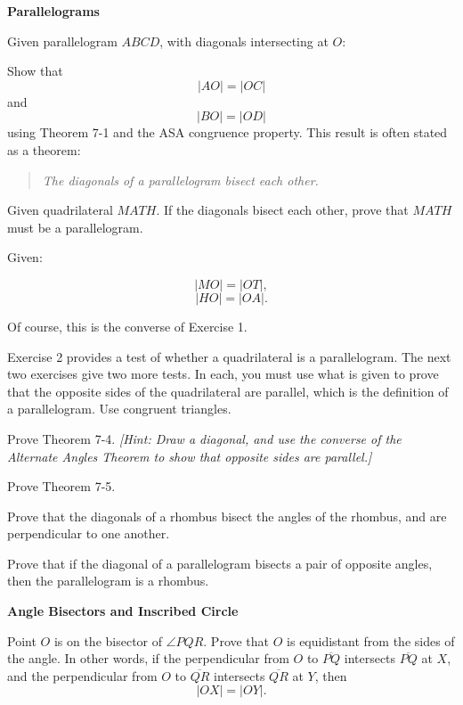 \documentclass[12pt]{book} %
\begin{document}
\setcounter{Exercise}{0}
\begin{ExerciseList}
\Exercise \textbf{Parallelograms}

Given parallelogram $ABCD$, with diagonals intersecting at $O$:


Show that
\[
|AO|=|OC|
\]
and
\[
|BO|=|OD|
\]
using Theorem 7-1 and the ASA congruence property. This result is often stated as a theorem:

\begin{quote}
\textit{The diagonals of a parallelogram bisect each other.}
\end{quote}

\Exercise Given quadrilateral $MATH$. If the diagonals bisect each other, prove that $MATH$ must be a parallelogram.

Given:


\[
|MO|=|OT|,
\]
\[
|HO|=|OA|.
\]

Of course, this is the converse of Exercise 1.

Exercise 2 provides a test of whether a quadrilateral is a parallelogram. The next two exercises give two more tests. In each, you must use what is given to prove that the opposite sides of the quadrilateral are parallel, which is the definition of a parallelogram. Use congruent triangles.

\Exercise Prove Theorem 7-4. \textit{[Hint: Draw a diagonal, and use the converse of the Alternate Angles Theorem to show that opposite sides are parallel.]}

\Exercise Prove Theorem 7-5.

\Exercise Prove that the diagonals of a rhombus bisect the angles of the rhombus, and are perpendicular to one another.

\Exercise Prove that if the diagonal of a parallelogram bisects a pair of opposite angles, then the parallelogram is a rhombus.

\Exercise \textbf{Angle Bisectors and Inscribed Circle}

Point $O$ is on the bisector of $\angle PQR$. Prove that $O$ is equidistant from the sides of the angle. In other words, if the perpendicular from $O$ to $\overline{PQ}$ intersects $\overline{PQ}$ at $X$, and the perpendicular from $O$ to $\overline{QR}$ intersects $\overline{QR}$ at $Y$, then
\[
|OX|=|OY|.
\]



\end{ExerciseList}
\end{document}
